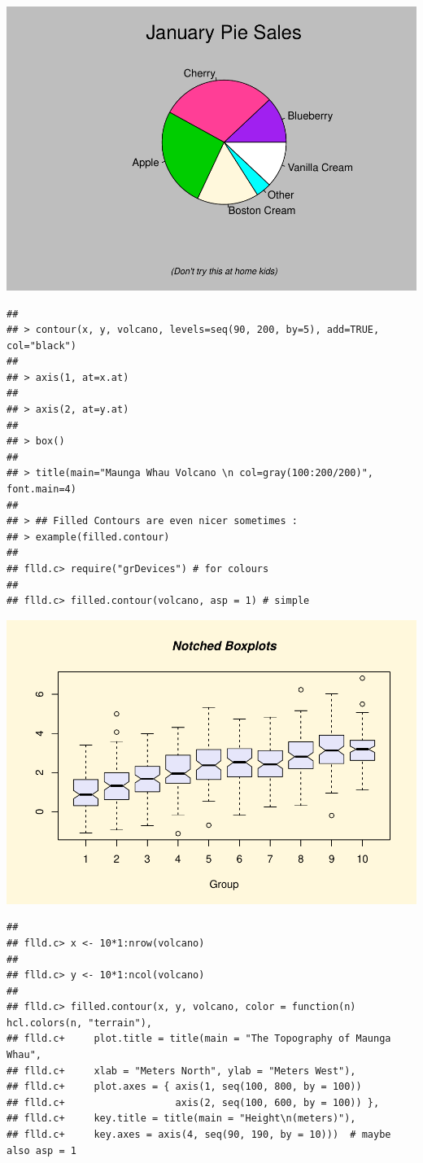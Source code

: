 \documentclass[
]{book}
\begin{document}
\includegraphics{TudodoR_files/figure-latex/unnamed-chunk-147-3.pdf}

\begin{verbatim}
## 
## > contour(x, y, volcano, levels=seq(90, 200, by=5), add=TRUE, col="black")
## 
## > axis(1, at=x.at)
## 
## > axis(2, at=y.at)
## 
## > box()
## 
## > title(main="Maunga Whau Volcano \n col=gray(100:200/200)", font.main=4)
## 
## > ## Filled Contours are even nicer sometimes :
## > example(filled.contour)
## 
## flld.c> require("grDevices") # for colours
## 
## flld.c> filled.contour(volcano, asp = 1) # simple
\end{verbatim}

\includegraphics{TudodoR_files/figure-latex/unnamed-chunk-147-4.pdf}

\begin{verbatim}
## 
## flld.c> x <- 10*1:nrow(volcano)
## 
## flld.c> y <- 10*1:ncol(volcano)
## 
## flld.c> filled.contour(x, y, volcano, color = function(n) hcl.colors(n, "terrain"),
## flld.c+     plot.title = title(main = "The Topography of Maunga Whau",
## flld.c+     xlab = "Meters North", ylab = "Meters West"),
## flld.c+     plot.axes = { axis(1, seq(100, 800, by = 100))
## flld.c+                   axis(2, seq(100, 600, by = 100)) },
## flld.c+     key.title = title(main = "Height\n(meters)"),
## flld.c+     key.axes = axis(4, seq(90, 190, by = 10)))  # maybe also asp = 1
\end{verbatim}
\end{document}
